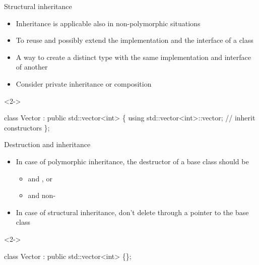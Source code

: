 \begin{frame}[fragile]{Structural inheritance}

  \begin{itemize}
  \item Inheritance is applicable also in non-polymorphic situations
  \item To reuse and possibly extend the implementation and the interface of a
    class
  \item A way to create a distinct type with the same implementation and
    interface of another
  \item<5-> Consider private inheritance or composition
  \end{itemize}

  \begin{codeblock}<2->{
class Vector : public std::vector<int> \{
  using std::vector<int>::vector; // inherit constructors
\};


}\end{codeblock}

\end{frame}

\begin{frame}[fragile]{Destruction and inheritance}
  \begin{itemize}
  \item In case of polymorphic inheritance, the destructor of a base class
    should be
    \begin{itemize}
    \item {} and , or
    \item {} and non-
    \end{itemize}
  \item<2-> In case of structural inheritance, don't delete through a
    pointer to the base class
  \end{itemize}

    \begin{codeblock}<2->{
class Vector : public std::vector<int> \{\};



}\end{codeblock}

\end{frame}

